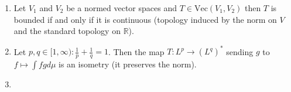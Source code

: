 \documentclass{article}
\begin{document}
\begin{enumerate}
    \section*{Del V}
    \item Let $V_1$ and $V_2$ be a normed vector spaces and $T\in \text{Vec}(V_1,V_2)$ then $T$ is bounded if and only if it is continuous (topology induced by the norm on $V$ and the standard topology on $\mathbb{R}$).
    \item Let $p,q\in[1,\infty) : \frac{1}{p}+ \frac{1}{q} = 1$. Then the map $T: L^p \to (L^q)^*$ sending $g$ to $f\mapsto \int fgd\mu$ is an isometry (it preserves the norm).
    \item 
\end{enumerate}
\end{document}
